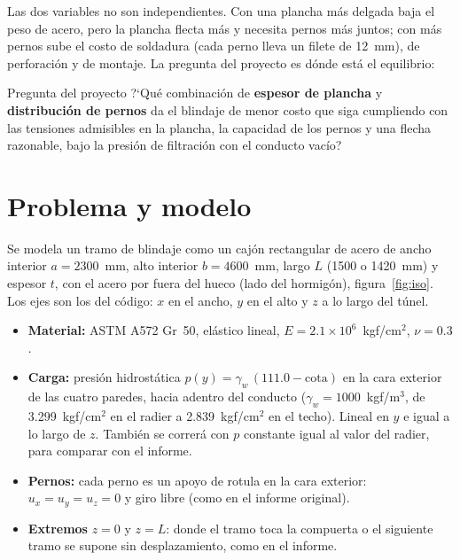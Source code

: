 \documentclass[11pt]{article}
\begin{document}
Las dos variables no son independientes. Con una plancha m\'as delgada baja el peso de acero, pero la
plancha flecta m\'as y necesita pernos m\'as juntos; con m\'as pernos sube el costo de soldadura
(cada perno lleva un filete de 12~mm), de perforaci\'on y de montaje. La pregunta del proyecto es
d\'onde est\'a el equilibrio:

\begin{desarrollo}{Pregunta del proyecto}
?`Qu\'e combinaci\'on de \textbf{espesor de plancha} y \textbf{distribuci\'on de pernos} da el blindaje
de menor costo que siga cumpliendo con las tensiones admisibles en la plancha, la capacidad de los
pernos y una flecha razonable, bajo la presi\'on de filtraci\'on con el conducto vac\'io?
\end{desarrollo}

\section{Problema y modelo}

Se modela un tramo de blindaje como un caj\'on rectangular de acero de ancho interior $a = 2300$~mm,
alto interior $b = 4600$~mm, largo $L$ (1500 o 1420~mm) y espesor $t$, con el acero por fuera del hueco
(lado del hormig\'on), figura~\ref{fig:iso}. Los ejes son los del c\'odigo: $x$ en el ancho, $y$ en el
alto y $z$ a lo largo del t\'unel.

\begin{itemize}[leftmargin=1.3em, itemsep=2pt]
  \item \textbf{Material:} ASTM A572 Gr~50, el\'astico lineal, $E = 2.1\times10^{6}$~kgf/cm$^2$,
        $\nu = 0.3$.
  \item \textbf{Carga:} presi\'on hidrost\'atica $p(y) = \gamma_w\,(111.0 - \text{cota})$ en la cara
        exterior de las cuatro paredes, hacia adentro del conducto ($\gamma_w = 1000$~kgf/m$^3$, de
        3.299~kgf/cm$^2$ en el radier a 2.839~kgf/cm$^2$ en el techo). Lineal en $y$ e igual a lo largo
        de $z$. Tambi\'en se correr\'a con $p$ constante igual al valor del radier, para comparar con
        el informe.
  \item \textbf{Pernos:} cada perno es un apoyo de rotula en la cara exterior:
        $u_x = u_y = u_z = 0$ y giro libre (como en el informe original).
  \item \textbf{Extremos} $z = 0$ y $z = L$: donde el tramo toca la compuerta o el siguiente tramo se
        supone sin desplazamiento, como en el informe.
\end{itemize}
\end{document}
